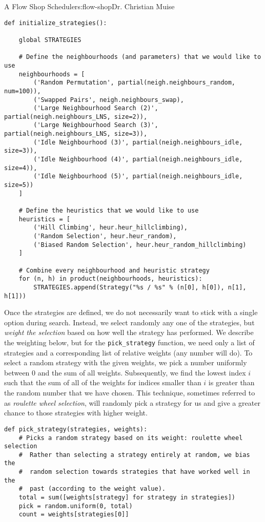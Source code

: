 \begin{aosachapter}{A Flow Shop Scheduler}{s:flow-shop}{Dr. Christian Muise}
\begin{verbatim}
def initialize_strategies():

    global STRATEGIES

    # Define the neighbourhoods (and parameters) that we would like to use
    neighbourhoods = [
        ('Random Permutation', partial(neigh.neighbours_random, num=100)),
        ('Swapped Pairs', neigh.neighbours_swap),
        ('Large Neighbourhood Search (2)', partial(neigh.neighbours_LNS, size=2)),
        ('Large Neighbourhood Search (3)', partial(neigh.neighbours_LNS, size=3)),
        ('Idle Neighbourhood (3)', partial(neigh.neighbours_idle, size=3)),
        ('Idle Neighbourhood (4)', partial(neigh.neighbours_idle, size=4)),
        ('Idle Neighbourhood (5)', partial(neigh.neighbours_idle, size=5))
    ]

    # Define the heuristics that we would like to use
    heuristics = [
        ('Hill Climbing', heur.heur_hillclimbing),
        ('Random Selection', heur.heur_random),
        ('Biased Random Selection', heur.heur_random_hillclimbing)
    ]

    # Combine every neighbourhood and heuristic strategy
    for (n, h) in product(neighbourhoods, heuristics):
        STRATEGIES.append(Strategy("%s / %s" % (n[0], h[0]), n[1], h[1]))
\end{verbatim}

Once the strategies are defined, we do not necessarily want to stick
with a single option during search. Instead, we select randomly any one
of the strategies, but \emph{weight the selection} based on how well the
strategy has performed. We describe the weighting below, but for the
\texttt{pick\_strategy} function, we need only a list of strategies and
a corresponding list of relative weights (any number will do). To select
a random strategy with the given weights, we pick a number uniformly
between 0 and the sum of all weights. Subsequently, we find the lowest
index $i$ such that the sum of all of the weights for indices smaller
than $i$ is greater than the random number that we have chosen. This
technique, sometimes referred to as \emph{roulette wheel selection},
will randomly pick a strategy for us and give a greater chance to those
strategies with higher weight.

\begin{verbatim}
def pick_strategy(strategies, weights):
    # Picks a random strategy based on its weight: roulette wheel selection
    #  Rather than selecting a strategy entirely at random, we bias the
    #  random selection towards strategies that have worked well in the
    #  past (according to the weight value).
    total = sum([weights[strategy] for strategy in strategies])
    pick = random.uniform(0, total)
    count = weights[strategies[0]]


\end{verbatim}
\end{aosachapter}
